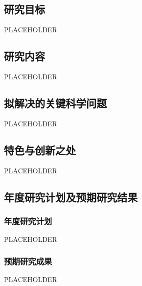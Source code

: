 
\noindent\hspace{\parindent}

\subsection{研究目标}

PLACEHOLDER

\subsection{研究内容}

PLACEHOLDER

\subsection{拟解决的关键科学问题}

PLACEHOLDER

\subsection{特色与创新之处}

PLACEHOLDER

\subsection{年度研究计划及预期研究结果}

\subsubsection{年度研究计划}

PLACEHOLDER

\subsubsection{预期研究成果}

PLACEHOLDER
